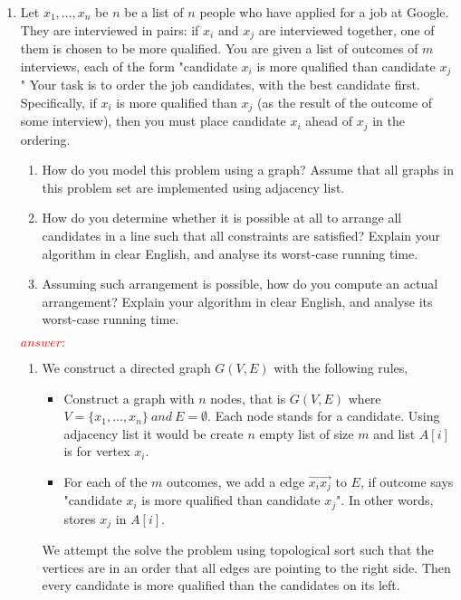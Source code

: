 \documentclass[11pt,twoside]{article}
\begin{document}
\begin{enumerate}[leftmargin=0pt]

\item
Let $x_1,\ldots,x_n$ be $n$ be a list of $n$ people who have applied
for a job at Google. They are interviewed in pairs: if $x_i$ and $x_j$
are interviewed together, one of them is chosen to be more qualified. 
You are given a list of outcomes of $m$ interviews, each of the form
"candidate $x_i$ is more qualified than candidate $x_j$"
Your task is to order the job candidates, with the best candidate first.
Specifically, if $x_i$ is more qualified than $x_j$ (as the result
of the outcome of some interview), then you must place candidate $x_i$
ahead of $x_j$ in the ordering.
\begin{enumerate}[label=(\alph*)]
        \item How do you model this problem using a graph? Assume that all
                graphs in this problem set are implemented using adjacency list.
        \item How do you determine whether it is possible at all to arrange
                all candidates in a line such that all constraints are satisfied? Explain your
                algorithm in clear English, and analyse its worst-case running time.
        \item Assuming such arrangement is possible, how do you compute an
                actual arrangement? Explain your algorithm in clear English, and
                analyse its worst-case running time.
\end{enumerate}
\textcolor{red}{$answer:$}
\begin{enumerate}
\item We construct  a directed graph  $G(V,E)$ with the following rules,
	\begin{itemize}
	\item Construct a graph with $n$ nodes, that is  $G(V,E)$ where $V =\{ x_1,\ldots,x_n \} \ and \ E = \emptyset$. Each node stands for a  candidate. Using adjacency list it would be create $n$ empty list of size $m$ and list $A[i]$ is for vertex $x_i$.
	\item For each of the $m$ outcomes, we add a edge $\overrightarrow{x_ix_j}$ to $E$, if  outcome says "candidate $x_i$ is more qualified than candidate $x_j$". In other words, stores $x_j$ in $A[i]$.
	\end{itemize}
	We attempt the solve the problem using topological sort such that the vertices are in an order that all edges are pointing to the right side. Then every candidate is more qualified than the candidates on its left.

\end{enumerate}
\end{enumerate}
\end{document}
